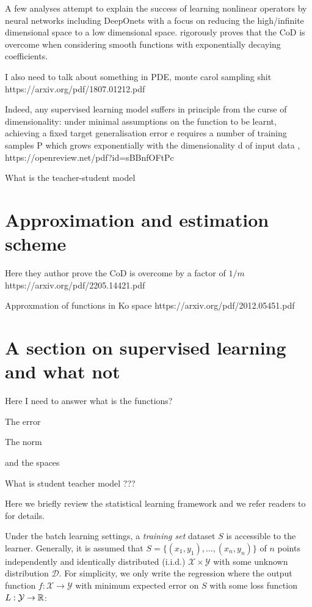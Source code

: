 A few analyses attempt to explain the success of learning nonlinear operators by
neural networks including DeepOnets with a focus on reducing the high/infinite
dimensional space to a low dimensional space.
\cite{lanthalerErrorEstimatesDeepOnets2022} rigorously proves that the CoD is
overcome when considering smooth functions with exponentially decaying
coefficients.

I also need to talk about something in PDE, monte carol sampling shit https://arxiv.org/pdf/1807.01212.pdf

Indeed, any supervised learning model suffers in principle from the curse of
dimensionality: under minimal assumptions on the function to be learnt,
achieving a fixed target generalisation error e requires a number of training
samples P which grows exponentially with the dimensionality d of input data ,
 https://openreview.net/pdf?id=sBBnfOFtPc

What is the teacher-student model

\section{Approximation and estimation scheme}


Here they author prove the CoD is overcome by a factor of $1/m$
https://arxiv.org/pdf/2205.14421.pdf

Approxmation of functions in Ko space https://arxiv.org/pdf/2012.05451.pdf

\section{A section on supervised learning and what not}

Here I need to answer what is the functions?

The error

The norm

and the spaces

What is student teacher model ???

Here we briefly review the statistical learning framework and we refer readers to \cite{shalev-shwartzUnderstandingMachineLearning2014a} for details.

Under the batch learning settings, a \textit{training set} dataset $S$ is
accessible to the learner. Generally, it is assumed that $S = \{(x_1,y_1),
\dots, (x_n, y_n)\}$ of $n$ points independently and identically distributed
(i.i.d.) $\mathcal{X} \times \mathcal{Y}$ with some unknown distribution
$\mathcal{D}$. For simplicity, we only write the regression where the output
function $f: \mathcal{X} \to \mathcal{Y}$ with minimum expected error on $S$
with some loss function $L: \mathcal{Y} \to \mathbb{R}$:

